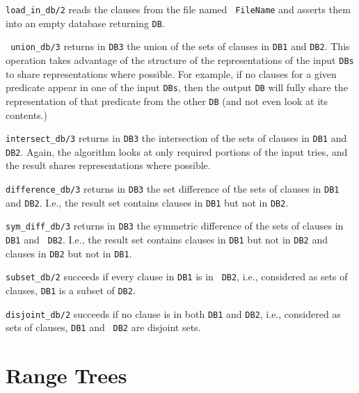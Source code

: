 \begin{description}
{\tt load\_in\_db/2} reads the clauses from the file named {\tt
FileName} and asserts them into an empty database returning {\tt DB}.

 {\tt
  union\_db/3} returns in {\tt DB3} the union of the sets of clauses
in {\tt DB1} and {\tt DB2}.  This operation takes advantage of the
structure of the representations of the input {\tt DBs} to share
representations where possible.  For example, if no clauses for a
given predicate appear in one of the input {\tt DBs}, then the output
{\tt DB} will fully share the representation of that predicate from
the other {\tt DB} (and not even look at its contents.)

{\tt intersect\_db/3} returns in {\tt DB3} the intersection of the
sets of clauses in {\tt DB1} and {\tt DB2}.  Again, the algorithm
looks at only required portions of the input tries, and the result
shares representations where possible.

{\tt difference\_db/3} returns in {\tt DB3} the set difference of the
sets of clauses in {\tt DB1} and {\tt DB2}.  I.e., the result set
contains clauses in {\tt DB1} but not in {\tt DB2}.

           {\tt sym\_diff\_db/3} returns in {\tt DB3} the symmetric
           difference of the sets of clauses in {\tt DB1} and {\tt
             DB2}.  I.e., the result set contains clauses in {\tt DB1}
           but not in {\tt DB2} and clauses in {\tt DB2} but not in
           {\tt DB1}.

{\tt subset\_db/2} succeeds if every clause in {\tt DB1} is in {\tt
  DB2}, i.e., considered as sets of clauses, {\tt DB1} is a subset of
{\tt DB2}.

{\tt disjoint\_db/2} succeeds if no clause is in both {\tt DB1} and
{\tt DB2}, i.e., considered as sets of clauses, {\tt DB1} and {\tt
  DB2} are disjoint sets.

\end{description}

\section{Range Trees}

